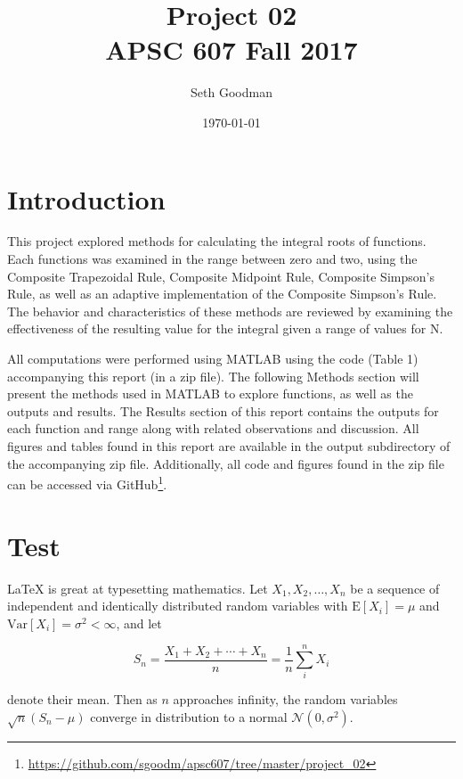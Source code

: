 \documentclass[a4paper]{article}
\title{
	Project 02 \\
	\bigskip
	\normalsize APSC 607 Fall 2017
}
\author{Seth Goodman}
\date{\today}
\begin{document}
\maketitle



\section{Introduction}
\label{sec:introduction}


This project explored methods for calculating the integral roots of functions. Each functions was  examined in the range between zero and two, using the Composite Trapezoidal Rule, Composite Midpoint Rule, Composite Simpson’s Rule, as well as an adaptive implementation of the Composite Simpson’s Rule. The behavior and characteristics of these methods are reviewed by examining the effectiveness of the resulting value for the integral given a range of values for N. 

All computations were performed using MATLAB using the code (Table 1) accompanying this report (in a zip file). The following Methods section will present the methods used in MATLAB to explore functions, as well as the outputs and results. The Results section of this report contains the outputs for each function and range along with related observations and discussion. All figures and tables found in this report are available in the output subdirectory of the accompanying zip file. Additionally, all code and figures found in the zip file can be accessed via GitHub\footnote{\url{https://github.com/sgoodm/apsc607/tree/master/project_02}}.



\newpage
\section{Test}

\LaTeX{} is great at typesetting mathematics. Let $X_1, X_2, \ldots, X_n$ be a sequence of independent and identically distributed random variables with $\text{E}[X_i] = \mu$ and $\text{Var}[X_i] = \sigma^2 < \infty$, and let


\begin{equation}
S_n = \frac{X_1 + X_2 + \cdots + X_n}{n}
      = \frac{1}{n}\sum_{i}^{n} X_i
\label{eq:sn}
\end{equation}

denote their mean. Then as $n$ approaches infinity, the random variables $\sqrt{n}(S_n - \mu)$ converge in distribution to a normal $\mathcal{N}(0, \sigma^2)$.
\end{document}
